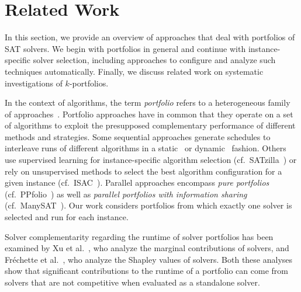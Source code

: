 \documentclass[a4paper,USenglish,pdfa]{lipics-v2021} %
\begin{document}
\section{Related Work}
\label{sec:related-work}

In this section, we provide an overview of approaches that deal with portfolios of SAT solvers. 
We begin with portfolios in general and continue with instance-specific solver selection, including approaches to configure and analyze such techniques automatically. 
Finally, we discuss related work on systematic investigations of $k$-portfolios.

In the context of algorithms, the term \emph{portfolio} refers to a heterogeneous family of approaches~\cite{kerschke2019automated}. 
Portfolio approaches have in common that they operate on a set of algorithms to exploit the presupposed complementary performance of different methods and strategies. 
Some sequential approaches generate schedules to interleave runs of different algorithms in a static~\cite{Gomes:2001:AlgoSched} or dynamic~\cite{Carchrae:2005:AlgoSched,Streeter:2007:AlgoSched} fashion. 
Others use supervised learning for instance-specific algorithm selection (cf.~SATzilla~\cite{xu2008satzilla}) or rely on unsupervised methods to select the best algorithm configuration for a given instance (cf.~ISAC~\cite{Kadioglu:2010:ISAC}).
Parallel approaches encompass \emph{pure portfolios} (cf.~PPfolio~\cite{Roussel:2012:ppfolio}) as well as \emph{parallel portfolios with information sharing} (cf.~ManySAT~\cite{Hamadi:2009:ManySAT}).
Our work considers portfolios from which exactly one solver is selected and run for each instance.

Solver complementarity regarding the runtime of solver portfolios has been examined by Xu et al.~\cite{Xu:2012:EvalContribVBS}, who analyze the marginal contributions of solvers,
and Fr{\'e}chette et al.~\cite{frechette2016using}, who analyze the Shapley values of solvers. 
Both these analyses show that significant contributions to the runtime of a portfolio can come from solvers that are not competitive when evaluated as a standalone solver. 
\end{document}
